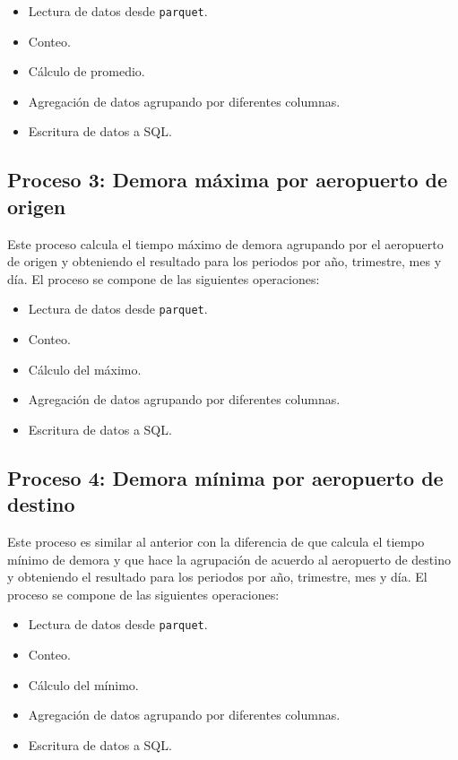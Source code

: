 \begin{itemize}
	\item Lectura de datos desde \texttt{parquet}.
	\item Conteo.
	\item Cálculo de promedio.
	\item Agregación de datos agrupando por diferentes columnas.
	\item Escritura de datos a SQL.
\end{itemize}

\subsection{Proceso 3: Demora máxima por aeropuerto de origen}

Este proceso calcula el tiempo máximo de demora agrupando por el aeropuerto de origen y obteniendo el resultado para los periodos por año, trimestre, mes y día. El proceso se compone de las siguientes operaciones:

\begin{itemize}
	\item Lectura de datos desde \texttt{parquet}.
	\item Conteo.
	\item Cálculo del máximo.
	\item Agregación de datos agrupando por diferentes columnas.
	\item Escritura de datos a SQL.
\end{itemize}

\subsection{Proceso 4: Demora mínima por aeropuerto de destino}

Este proceso es similar al anterior con la diferencia de que calcula el tiempo mínimo de demora y que hace la agrupación de acuerdo al aeropuerto de destino y obteniendo el resultado para los periodos por año, trimestre, mes y día. El proceso se compone de las siguientes operaciones:

\begin{itemize}
	\item Lectura de datos desde \texttt{parquet}.
	\item Conteo.
	\item Cálculo del mínimo.
	\item Agregación de datos agrupando por diferentes columnas.
	\item Escritura de datos a SQL.
\end{itemize}

